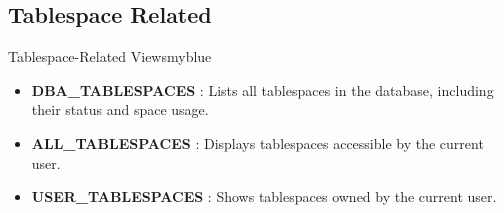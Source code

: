 \vspace{0.25cm}
\subsection{Tablespace Related}
\begin{prettyBox}{Tablespace-Related Views}{myblue}
\begin{itemize}
    \item \textbf{DBA\_TABLESPACES} : Lists all tablespaces in the database, including their status and space usage.
    \item \textbf{ALL\_TABLESPACES} : Displays tablespaces accessible by the current user.
    \item \textbf{USER\_TABLESPACES} : Shows tablespaces owned by the current user.
\end{itemize}
\end{prettyBox}

